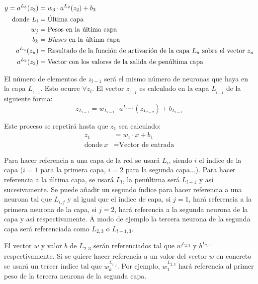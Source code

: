 \begin{equation}
    \begin{split}
    y = a^{L_3}(z_3) &= w_3 \cdot a^{L_2}(z_2) + b_3 \\ 
    \text{donde}~L_i &= \text{Última capa}  \\
  ~w_j &= \text{Pesos en la última capa } \\ 
  ~b_k &= \text{\textit{Biases} en la última capa} \\
  ~a^{L_{u}}(z_{u}) &= \text{Resultado de la función de activación de la capa } L_{u} \text{ sobre el vector } z_u \\
  ~a^{L_2}(z_2) &= \text{Vector con los valores de la salida de penúltima capa}
  \end{split}
  \label{eqn:layer3}
\end{equation}


El número de elementos de $z_{l-1}$ será el mismo número de neuronas que haya en la capa $L__{l-1}$. Esto ocurre $\forall z_i$. El vector $z__{l-1}$ es calculado en la capa $L__{l-1}$ de la siguiente forma:
\begin{equation}
    z_{L_{l-1}} = w_{L_{l-1}} \cdot a^{L_{l-2}}(z_{L_{l-2}}) + b_{L_{l-1}}
  \label{eqn:layer2}
\end{equation}

Este proceso se repetirá hasta que $z_1$ sea calculado:
\begin{equation}
    \begin{split}
    z_1 &= w_1 \cdot x + b_1 \\
    \text{donde}~x &= \text{Vector de entrada}
  \end{split}
  \label{eqn:layer1}
\end{equation}

Para hacer referencia a una capa de la red se usará $L_i$, siendo $i$ el índice de la capa ($i=1$ para la primera capa, $i=2$ para la segunda capa...). Para hacer referencia a la última capa, se usará $L_l$, la penúltima será $L_{l-1}$ y así sucesivamente. Se puede añadir un segundo índice para hacer referencia a una neurona tal que $L_{i, j}$ y al igual que el índice de capa, si $j=1$, hará referencia a la primera neurona de la capa, si $j=2$, hará referencia a la segunda neurona de la capa y así respectivamente. A modo de ejemplo la tercera neurona de la segunda capa será referenciada como $L_{2, 3}$ o $L_{l-1, 3}$.
\newline

El vector $w$ y valor $b$ de $L_{2, 3}$ serán referenciados tal que $w^{L_{2,3}}$ y $b^{L_{2,3}}$ respectivamente. Si se quiere hacer referencia a un valor del vector $w$ en concreto se usará un tercer índice tal que $w^{L_{i,j}}_k$. Por ejemplo, $w^{L_{2,3}}_1$ hará referencia al primer peso de la tercera neurona de la segunda capa.
\newline

